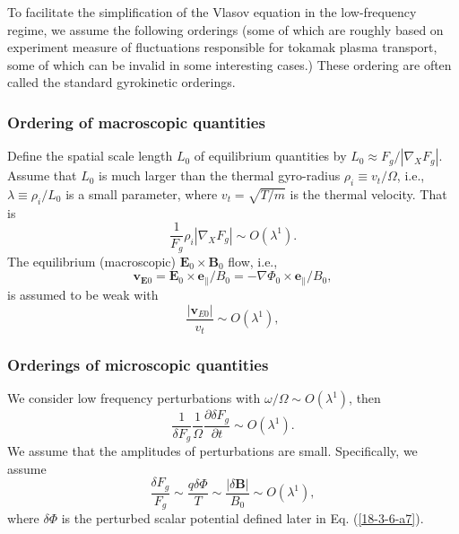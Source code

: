 \documentclass{llncs}
\begin{document}
To facilitate the simplification of the Vlasov equation in the low-frequency
regime, we assume the following orderings (some of which are roughly based on
experiment measure of fluctuations responsible for tokamak plasma transport,
some of which can be invalid in some interesting cases.) These ordering are
often called the standard gyrokinetic orderings.

\subsubsection{Ordering of macroscopic quantities}

Define the spatial scale length $L_0$ of equilibrium quantities by $L_0
\approx F_g / | \nabla_X F_g |$. Assume that $L_0$ is much larger than the
thermal gyro-radius $\rho_i \equiv v_t / \Omega$, i.e., $\lambda \equiv \rho_i
/ L_0$ is a small parameter, where $v_t = \sqrt{T / m}$ is the thermal
velocity. That is
\begin{equation}
  \label{17-5-15-1} \frac{1}{F_g} \rho_i | \nabla_X F_g | \sim O (\lambda^1) .
\end{equation}
The equilibrium (macroscopic) $\mathbf{E}_0 \times \mathbf{B}_0$ flow, i.e.,
\begin{equation}
  \mathbf{v}_{\mathbf{E}0} =\mathbf{E}_0 \times \mathbf{e}_{\parallel} / B_0 =
  - \nabla \Phi_0 \times \mathbf{e}_{\parallel} / B_0,
\end{equation}
is assumed to be weak with
\begin{equation}
  \frac{| \mathbf{v}_{E 0} |}{v_t} \sim O (\lambda^1),
\end{equation}

\subsubsection{Orderings of microscopic quantities}

We consider low frequency perturbations with $\omega / \Omega \sim O
(\lambda^1)$, then
\begin{equation}
  \frac{1}{\delta F_g} \frac{1}{\Omega} \frac{\partial \delta F_g}{\partial t}
  \sim O (\lambda^1) .
\end{equation}
We assume that the amplitudes of perturbations are small. Specifically, we
assume
\begin{equation}
  \frac{\delta F_g}{F_g} \sim \frac{q \delta \Phi}{T} \sim \frac{| \delta
  \mathbf{B} |}{B_0} \sim O (\lambda^1),
\end{equation}
where $\delta \Phi$ is the perturbed scalar potential defined later in Eq.
(\ref{18-3-6-a7}).
\end{document}
